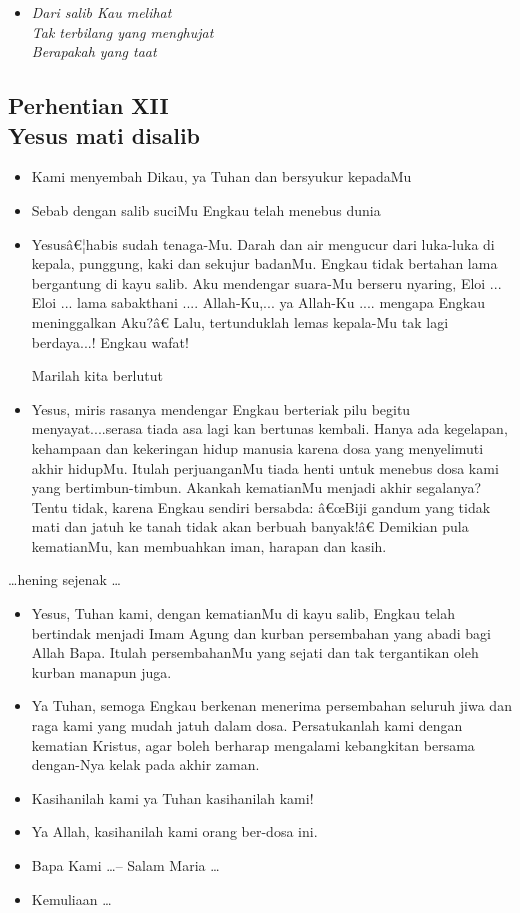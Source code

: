 \documentclass[a5paper,headsepline,titlepage,10pt,nnormalheadings,DIVcalc]{scrbook}
\newcommand{\BU}[1]{\begin{itemize} \item[U:] #1 \end{itemize}}
\newcommand{\BP}[1]{\begin{itemize} \item[P:] #1 \end{itemize}}
\newcommand{\BL}[1]{\begin{itemize} \item[L:] #1 \end{itemize}}
\begin{document}
\begin{itemize}
\item[12.] \it{Dari salib Kau melihat\\
Tak terbilang yang menghujat\\
Berapakah yang taat}
\end{itemize}



\subsection*{Perhentian XII
\\Yesus mati disalib}

\BP{Kami menyembah Dikau, ya Tuhan dan bersyukur kepadaMu}
\BU{Sebab dengan salib suciMu Engkau telah menebus dunia}
\BL{Yesusâ€¦habis sudah tenaga-Mu. Darah dan air mengucur dari luka-luka di kepala, punggung, kaki dan sekujur badanMu. Engkau tidak bertahan lama bergantung di kayu salib. Aku mendengar suara-Mu berseru nyaring, Eloi ... Eloi ... lama sabakthani .... Allah-Ku,... ya Allah-Ku .... mengapa Engkau meninggalkan Aku?â€ Lalu, tertunduklah lemas kepala-Mu tak lagi berdaya...! Engkau wafat!

Marilah kita berlutut}

\BL{Yesus, miris rasanya mendengar Engkau berteriak pilu begitu menyayat....serasa tiada asa lagi kan bertunas kembali. Hanya ada kegelapan, kehampaan dan kekeringan hidup manusia karena dosa yang menyelimuti akhir hidupMu. Itulah perjuanganMu tiada henti untuk menebus dosa kami yang bertimbun-timbun.
Akankah kematianMu menjadi akhir segalanya? Tentu tidak, karena Engkau sendiri bersabda: â€œBiji gandum yang tidak mati dan jatuh ke tanah tidak akan berbuah banyak!â€ Demikian pula kematianMu, kan membuahkan iman, harapan dan kasih.}

\begin{center}\dots hening sejenak \dots\end{center}

\BP{Yesus, Tuhan kami, dengan kematianMu di kayu salib, Engkau telah bertindak menjadi Imam Agung dan kurban persembahan yang abadi bagi Allah Bapa. Itulah persembahanMu yang sejati dan tak tergantikan oleh kurban manapun juga.}
\BU{Ya Tuhan, semoga Engkau berkenan menerima persembahan seluruh jiwa dan raga kami yang mudah jatuh dalam dosa. Persatukanlah kami dengan kematian Kristus, agar boleh berharap mengalami kebangkitan bersama dengan-Nya kelak pada akhir zaman.}
\BP{Kasihanilah kami ya Tuhan kasihanilah kami!}
\BU{Ya Allah, kasihanilah kami orang ber-dosa ini.}
\BP{Bapa Kami \dots -- Salam Maria \dots}
\BP{Kemuliaan \dots}
\end{document}
